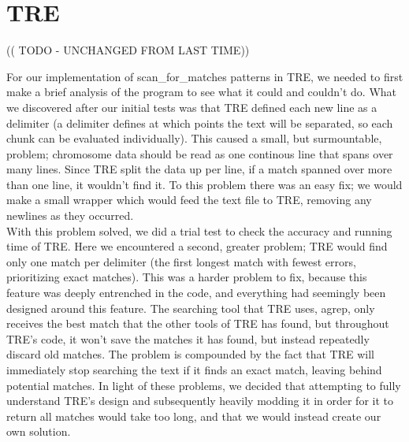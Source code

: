 \newpage
\section{TRE}
(( TODO - UNCHANGED FROM LAST TIME))
  
 For our implementation of scan\_for\_matches patterns in TRE, we needed to 
  first make a brief analysis of the program to see what it could and couldn't 
  do. What we discovered after our initial tests was that TRE defined each 
  new line as a delimiter (a delimiter defines at which points the text will be 
  separated, so each chunk can be evaluated individually). 
  This caused a small, but surmountable, problem; chromosome data 
  should be read as one continous line that spans over many lines. Since TRE 
  split the data up per line, if a match spanned over more than one line, it 
  wouldn't find it. To this problem there was an easy fix; we would make a small 
  wrapper which would feed the text file to TRE, removing any newlines as they 
  occurred.\\
  With this problem solved, we did a trial test to check the accuracy and 
  running time of TRE. Here we encountered a second, greater problem; TRE 
  would find only one match per delimiter (the first longest match with fewest 
  errors, prioritizing exact matches). This was a harder problem to fix, because this feature was 
  deeply entrenched in the code, and everything had seemingly been designed 
  around this feature. The searching tool that TRE uses, agrep, only receives 
  the best match that the other tools of TRE has found, but throughout TRE's 
  code, it won't save the matches it has found, but instead repeatedly discard old 
  matches. The problem is compounded by the fact that TRE will immediately stop searching the 
  text if it finds an exact match, leaving behind potential matches. In light of 
  these problems, we decided that attempting to fully understand TRE's design and 
  subsequently heavily modding it in order for it to return all matches would 
  take too long, and that we would instead create our own solution.